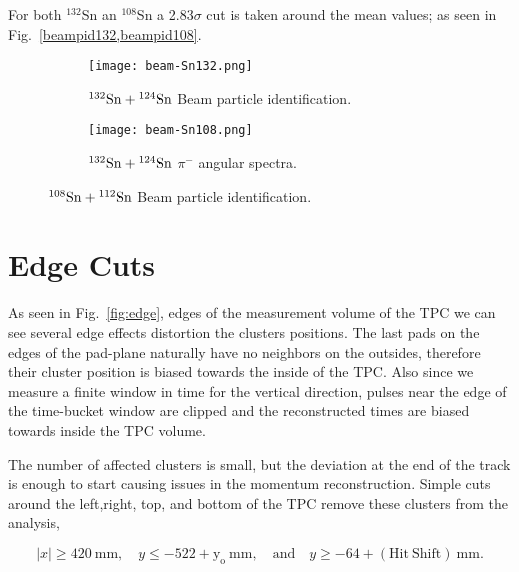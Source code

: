 For both ${}^{132}$Sn an ${}^{108}$Sn a 2.83$\sigma$ cut is taken around the mean values; as seen in Fig.~\ref{beampid132,beampid108}.


\begin{figure}[!htb]
     \centering
     \begin{subfigure}[b]{0.49\textwidth}
         \centering
         \texttt{[image: beam-Sn132.png]}
         \caption{${}^{132}\mathrm{Sn} + {}^{124}\mathrm{Sn}$ Beam particle identification.}
         \label{fig:beampid132}
     \end{subfigure}
     \hfill
     \begin{subfigure}[b]{0.49\textwidth}
         \centering
         \texttt{[image: beam-Sn108.png]}
         \caption{${}^{132}\mathrm{Sn} + {}^{124}\mathrm{Sn}$ $\pi^-$ angular spectra.}
         \label{fig:beampid108}
     \end{subfigure}
        \caption{${}^{108}\mathrm{Sn} + {}^{112}\mathrm{Sn}$ Beam particle identification. }
        \label{fig:beampid}
\end{figure}





\section{Edge Cuts}
As seen in Fig.~\ref{fig:edge}, edges of the measurement volume of the TPC we can see several edge effects distortion the clusters positions. The last pads on the edges of the pad-plane naturally have no neighbors on the outsides, therefore their cluster position is biased towards the inside of the TPC. Also since we measure a finite window in time for the vertical direction, pulses near the edge of the time-bucket window are clipped and the reconstructed times are biased towards inside the TPC volume. 

The number of affected clusters is small, but the deviation at the end of the track is enough to start causing issues in the momentum reconstruction. Simple cuts around the left,right, top, and bottom of the TPC remove these clusters from the analysis,

\begin{equation*}
  |x|\geq420~\mathrm{mm},\quad y\leq-522+\mathrm{y_o}~\mathrm{mm},
  \quad\mathrm{and}\quad y\geq-64+\mathrm{(Hit\ Shift)}~\mathrm{mm}.
\label{eq:hitshift}
\end{equation*}

